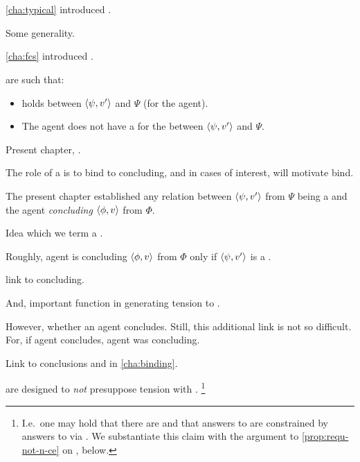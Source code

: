 \chapter{}
\label{cha:requs}

\begin{note}
  \autoref{cha:typical} introduced .

  Some generality.
\end{note}

\begin{note}
  \autoref{cha:fcs} introduced .

   are such that:
  \begin{itemize}
  \item
    \ros{} holds between \(\langle \psi, v' \rangle\) and \(\Psi\) (for the agent).
  \item
    The agent does not have a \wit{} for the \ros{} between \(\langle \psi, v' \rangle\) and \(\Psi\).
  \end{itemize}
\end{note}

\begin{note}
  Present chapter, .

  The role of a \requ{} is to bind \fc{} to concluding, and in cases of interest,  will motivate bind.
\end{note}

\begin{note}
  The present chapter established any relation between \(\langle \psi, v' \rangle\) from \(\Psi\) being a \fc{} and the agent \emph{concluding} \(\langle \phi, v \rangle\) from \(\Phi\).

  Idea which we term a \requ{}.

  Roughly, agent is concluding \(\langle \phi, v \rangle\) from \(\Phi\) only if \(\langle \psi, v' \rangle\) is a \fc{}.
\end{note}

\begin{note}
   link  to concluding.

  And, important function in generating tension to \issueConstraint{}.

  However, whether an agent concludes.
  Still, this additional link is not so difficult.
  For, if agent concludes, agent was concluding.

  Link  to conclusions and \issueConstraint{} in \autoref{cha:binding}.

   are designed to \emph{not} presuppose tension with \issueConstraint{}.%
  \footnote{
    I.e.\ one may hold that there are  and that answers to \qWhyV{} are constrained by answers to \qHowV{} via \issueConstraint{}.
    We substantiate this claim with the argument to \autoref{prop:requ-not-n-ce} on , below.
    }
\end{note}


